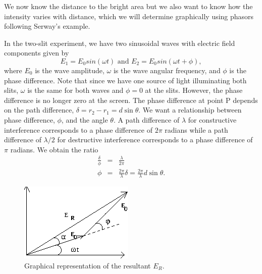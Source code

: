 We now know the distance to the bright area but we also want to know
how the intensity varies with distance, which we will determine
graphically using phasors following Serway's example.

In the two-slit experiment, we have two sinusoidal waves with 
electric field components given by
\begin{equation}
E_1 = E_0 sin(\omega t) \mbox{ and }E_2 = E_0 sin(\omega t + \phi),
\label{eqn:diff:E1E2}
\end{equation}
where $E_0$ is the wave amplitude, $\omega$ is the wave angular frequency,
and $\phi$ is the phase difference.  Note that since we have one source of 
light illuminating both slits, $\omega$ is the same for both waves and $\phi=0$
at the slits. However, the phase difference is no longer zero at the
screen.  The phase difference at point P depends on the path difference,
$\delta = r_2 - r_1 = d\sin \theta$.  We want a relationship between phase
difference, $\phi$, and the angle $\theta$.  A path difference of $\lambda$
for constructive interference corresponds to a phase difference of $2\pi$
radians while a path difference of $\lambda /2$ for destructive interference 
corresponds to a phase difference of $\pi$ radians.  We obtain the ratio
\begin{eqnarray}
\frac{\delta}{\phi} &=& \frac{\lambda}{2 \pi} \nonumber \\
\phi &=& \frac{2 \pi}{\lambda} \delta = \frac{2 \pi}{\lambda} d \sin \theta. 
\label{eqn:diff:phase difference}
\end{eqnarray}

\begin{figure}[htb]
\centering 
\epsfxsize=4cm \includegraphics[scale=1.5]{10_diffraction/2E.eps}
\caption{Graphical representation of the resultant $E_R$.} 
\label{fig:diff:2E}
\end{figure}

